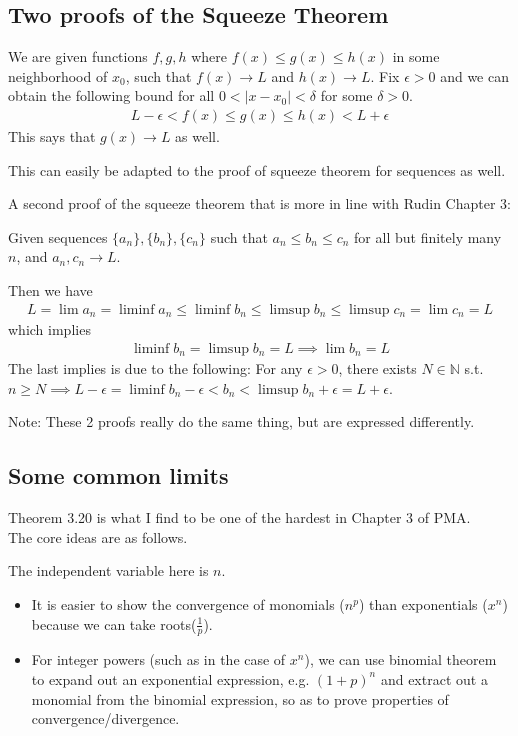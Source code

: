 \documentclass{article}
\begin{document}
\subsection{Two proofs of the Squeeze Theorem}
We are given functions $f,g,h$ where $f(x)\leq g(x)\leq h(x)$ in some neighborhood of $x_0$, such that $f(x)\rightarrow L$ and $h(x)\rightarrow L$. Fix $\epsilon > 0$ and we can obtain the following bound for all $0 < |x - x_0| < \delta$ for some $\delta > 0$.
\begin{align*}
	L - \epsilon < f(x) \leq g(x) \leq h(x) < L + \epsilon
\end{align*}
This says that $g(x)\rightarrow L$ as well.

This can easily be adapted to the proof of squeeze theorem for sequences as well.

A second proof of the squeeze theorem that is more in line with Rudin Chapter 3:

Given sequences $\{a_n\}, \{b_n\}, \{c_n\}$ such that $a_n\leq b_n\leq c_n$ for all but finitely many $n$, and $a_n, c_n\rightarrow L$.

Then we have \begin{align*}
	L = \lim a_n = \liminf a_n \leq \liminf b_n \leq \limsup b_n \leq \limsup c_n = \lim c_n = L
\end{align*}
which implies
\begin{align*}
	\liminf b_n = \limsup b_n = L \implies \lim b_n = L
\end{align*}
The last implies is due to the following: For any $\epsilon > 0$, there exists $N \in \mathbb{N}$ s.t. $n\geq N\implies L - \epsilon = \liminf b_n - \epsilon < b_n < \limsup b_n + \epsilon = L + \epsilon$.


Note: These 2 proofs really do the same thing, but are expressed differently.


\subsection{Some common limits}
Theorem 3.20 is what I find to be one of the hardest in Chapter 3 of PMA.\\
The core ideas are as follows.

The independent variable here is $n$.
\begin{itemize}
	\item It is easier to show the convergence of monomials ($n^p$) than exponentials ($x^n$) because we can take roots($\frac{1}{p}$).
	\item For integer powers (such as in the case of $x^n$), we can use binomial theorem to expand out an exponential expression, e.g. $(1+p)^n$ and extract out a monomial from the binomial expression, so as to prove properties of convergence/divergence.
\end{itemize}
\end{document}
